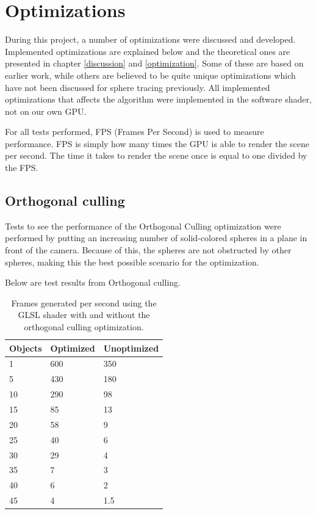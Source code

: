 	\section{Optimizations}
		
		During this project, a number of optimizations were discussed and
		developed. Implemented optimizations are explained below and the
		theoretical ones are presented in chapter \ref{discussion} and
		\ref{optimization}. Some of these are based on earlier work, while
		others are believed to be quite unique optimizations which have not been
		discussed for sphere tracing previously. All implemented optimizations
		that affects the algorithm were implemented in the software shader, not
		on our own GPU.

		For all tests performed, FPS (Frames Per Second) is used to measure
		performance. FPS is simply how many times the GPU is able to render 
		the scene per second. The time it takes to render the scene once is 
		equal to one divided by the FPS.

		\subsection{Orthogonal culling}
		
		Tests to see the performance of the Orthogonal Culling optimization
		were performed by putting an increasing number of solid-colored spheres
		in a plane in front of the camera. Because of this, the spheres are not
		obstructed by other spheres, making this the best possible scenario for
		the optimization.

		Below are test results from Orthogonal culling.

			\begin{table}
			\centering
			\begin{tabular}{lll}
				\hline
				Objects & Optimized & Unoptimized \\ 
				\hline
				1       & 600       & 350         \\ 
				5       & 430       & 180         \\			
				10      & 290       & 98          \\
				15      & 85        & 13          \\
				20      & 58        & 9           \\
				25      & 40        & 6           \\
				30      & 29        & 4           \\
				35      & 7         & 3           \\
				40      & 6         & 2           \\
				45      & 4         & 1.5         \\
				\hline
			\end{tabular}
			\caption{Frames generated per second using the GLSL shader with and
				without the orthogonal culling optimization.}
			\end{table}

